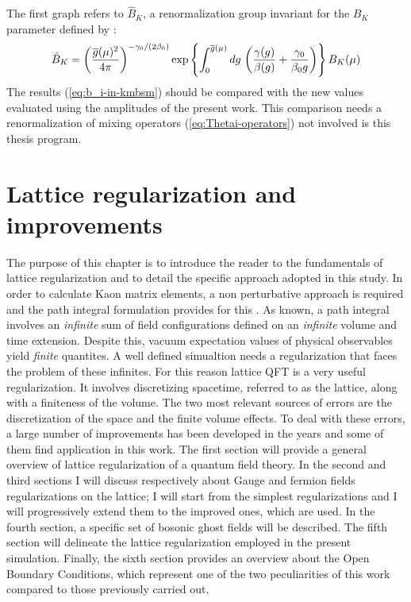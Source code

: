 \documentclass[english, LaM, oneside, noexaminfo]{sapthesis}
\newcommand{\obc}{Open Boundary Conditions}
\begin{document}
\newline
The first graph refers to $\hat B_K$, a renormalization group invariant for the $B_K$ parameter defined by \cite{FLAG}:
\begin{equation*}
    \hat B_K = \left(\frac{\overline{g}(\mu)^2}{4 \pi}\right)^{-\gamma_0/(2\beta_0)} \text{exp}\left\{ \int_0^{\overline{g}(\mu)} dg \hspace*{.5mm} \left( \frac{\gamma (g)}{\beta (g)} + \frac{\gamma_0}{\beta_0 g}\right) \right\} B_K (\mu)
\end{equation*}
\newline
The results (\ref{eq:b_i-in-kmbsm}) should be compared with the new values evaluated using the amplitudes of the present work.
This comparison needs a renormalization of mixing operators (\ref{eq:Thetai-operators}) not involved is this thesis program.

\chapter{Lattice regularization and improvements}\label{ch:lattice-regularization}
\lettrine[lines=2, findent=3pt, nindent=0pt]{T}{}he purpose of this chapter is to introduce the reader to the fundamentals of lattice regularization and to detail the specific approach adopted in this study.
\newline
In order to calculate Kaon matrix elements, a non perturbative approach is required and the path integral formulation provides for this \cite{Itzykson-Zuber}.
As known, a path integral involves an \textit{infinite} sum of field configurations defined on an \textit{infinite} volume and time extension.
Despite this, vacuum expectation values of physical observables yield \textit{finite} quantites.
A well defined simualtion needs a regularization that faces the problem of these infinites.
For this reason lattice QFT is a very useful regularization.
It involves discretizing spacetime, referred to as the lattice, along with a finiteness of the volume.
The two most relevant sources of errors are the discretization of the space and the finite volume effects.
To deal with these errors, a large number of improvements has been developed in the years and some of them find application in this work.
\newline
The first section will provide a general overview of lattice regularization of a quantum field theory.
In the second and third sections I will discuss respectively about Gauge and fermion fields regularizations on the lattice;
I will start from the simplest regularizations and I will progressively extend them to the improved ones, which are used.
In the fourth section, a specific set of bosonic ghost fields will be described.
The fifth section will delineate the lattice regularization employed in the present simulation.
Finally, the sixth section provides an overview about the \obc, which represent one of the two peculiarities of this work compared to those previously carried out.
\end{document}
